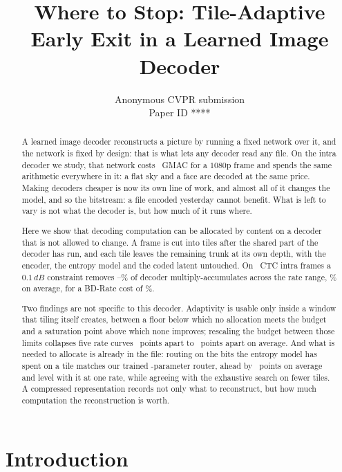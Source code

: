 \documentclass[10pt,twocolumn,letterpaper]{article}
\title{Where to Stop: Tile-Adaptive Early Exit in a Learned Image Decoder}
\author{Anonymous CVPR submission\\ Paper ID ****}
\newcommand{\dB}{\,dB}
\begin{document}
\maketitle

\begin{abstract}
A learned image decoder reconstructs a picture by running a fixed network over
it, and the network is fixed by design: that is what lets any decoder read any
file. On the intra decoder we study, that network costs \DecGmac\ GMAC for a $1080$p
frame and spends the same arithmetic everywhere in it: a flat sky and a face are
decoded at the same price. Making decoders cheaper is now its own line of
work, and almost all of it changes the model, and so the bitstream: a file
encoded yesterday cannot benefit. What is left to vary is not what the decoder
is, but how much of it runs where.

Here we show that decoding computation can be allocated by content on a decoder
that is not allowed to change. A frame is cut into tiles after the shared part
of the decoder has run, and each tile leaves the remaining trunk at its own
depth, with the encoder, the entropy model and the coded latent untouched. On
\NumSeq\ CTC intra frames a $0.1\dB$ constraint removes
\MainLowRate--\MainHighRate\% of decoder multiply-accumulates across the rate
range, \MeanAtOne\% on average, for a BD-Rate cost of \BdRateALow\%.

Two findings are not specific to this decoder. Adaptivity is usable only inside
a window that tiling itself creates, between a floor below which no allocation
meets the budget and a saturation point above which none improves; rescaling the
budget between those limits collapses five rate curves \BandRawSpread\ points
apart to \BandSpreadMean\ points apart on average. And what is needed to allocate is already
in the file: routing on the bits the entropy model has spent on a tile matches
our trained \RouterParams-parameter router, ahead by \RateRankBeatsMean\ points
on average and level with it at one rate, while agreeing with the exhaustive
search on fewer tiles. A compressed representation records not only what to
reconstruct, but how much computation the reconstruction is worth.
\end{abstract}

\section{Introduction}
\end{document}
